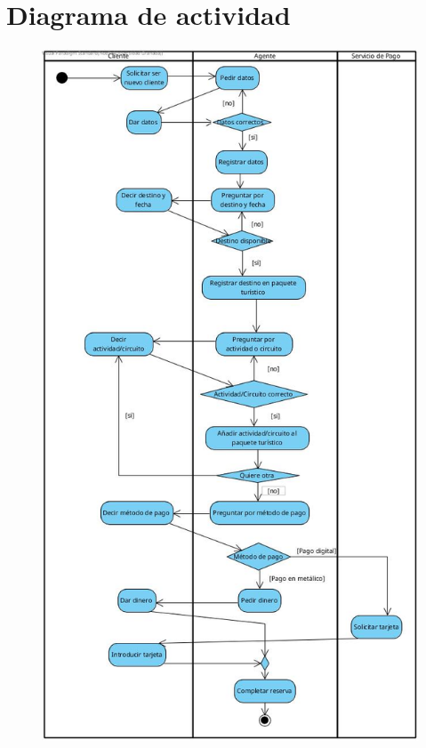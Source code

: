 \documentclass{article}
\begin{document}
	\section{Diagrama de actividad}
	\begin{figure}[H]
		\centering
		\includegraphics[totalheight=16cm]{Actividad}
	\end{figure}
\end{document}
